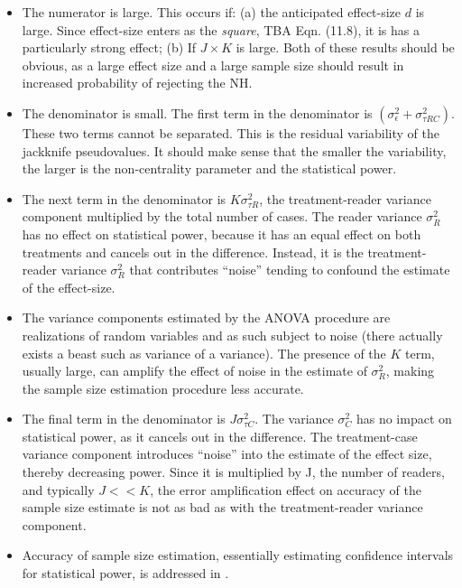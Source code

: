 \documentclass[
]{book}
\providecommand{\tightlist}{%
  \setlength{\itemsep}{0pt}\setlength{\parskip}{0pt}}
\begin{document}
\begin{itemize}
\tightlist
\item
  The numerator is large. This occurs if: (a) the anticipated effect-size \(d\) is large. Since effect-size enters as the \emph{square}, TBA Eqn. (11.8), it is has a particularly strong effect; (b) If \(J \times K\) is large. Both of these results should be obvious, as a large effect size and a large sample size should result in increased probability of rejecting the NH.
\item
  The denominator is small. The first term in the denominator is \(\left ( \sigma_{\epsilon}^2 + \sigma_{\tau RC}^2 \right )\). These two terms cannot be separated. This is the residual variability of the jackknife pseudovalues. It should make sense that the smaller the variability, the larger is the non-centrality parameter and the statistical power.
\item
  The next term in the denominator is \(K\sigma_{\tau R}^2\), the treatment-reader variance component multiplied by the total number of cases. The reader variance \(\sigma_{R}^2\) has no effect on statistical power, because it has an equal effect on both treatments and cancels out in the difference. Instead, it is the treatment-reader variance \(\sigma_{R}^2\) that contributes ``noise'' tending to confound the estimate of the effect-size.
\item
  The variance components estimated by the ANOVA procedure are realizations of random variables and as such subject to noise (there actually exists a beast such as variance of a variance). The presence of the \(K\) term, usually large, can amplify the effect of noise in the estimate of \(\sigma_{R}^2\), making the sample size estimation procedure less accurate.
\item
  The final term in the denominator is \(J\sigma_{\tau C}^2\). The variance \(\sigma_{C}^2\) has no impact on statistical power, as it cancels out in the difference. The treatment-case variance component introduces ``noise'' into the estimate of the effect size, thereby decreasing power. Since it is multiplied by J, the number of readers, and typically \(J<<K\), the error amplification effect on accuracy of the sample size estimate is not as bad as with the treatment-reader variance component.
\item
  Accuracy of sample size estimation, essentially estimating confidence intervals for statistical power, is addressed in \citep{RN2027}.
\end{itemize}
\end{document}
